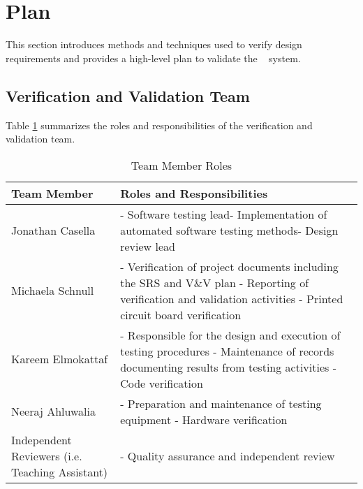 \documentclass[12pt, titlepage]{article}
\begin{document}
\section{Plan} \label{Plan}


This section introduces methods and techniques used to verify design requirements and provides a high-level plan to validate the \progname~ system. 

\subsection{Verification and Validation Team}

  
\noindent Table \ref{Table:Roles} summarizes the roles and responsibilities of the verification and validation team.
  
\begin{table}[H]
\caption{Team Member Roles}
\label{Table:Roles}
\begin{tabularx}{\textwidth}{|p{5cm}|X|}
\hline{\bf Team Member} & {\bf Roles and Responsibilities} \\
\hline
Jonathan Casella & - Software testing lead\newline - Implementation of automated software testing methods\newline - Design review lead\\
\hline
Michaela Schnull &  - Verification of project documents including the SRS and V\&V plan \newline - Reporting of verification and validation activities \newline - Printed circuit board verification\\
\hline
Kareem Elmokattaf &  - Responsible for the design and execution of testing procedures \newline - Maintenance of  records documenting results from testing activities \newline - Code verification\\
\hline
Neeraj Ahluwalia &  - Preparation and maintenance of testing equipment \newline - Hardware verification\\
\hline
Independent Reviewers (i.e. Teaching Assistant) &  - Quality assurance and independent review\\
\hline
\end{tabularx}
\label{Table:Roles}
\end{table}
\end{document}
